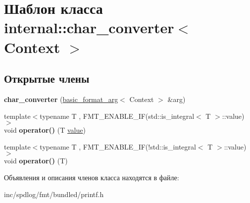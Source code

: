 \hypertarget{classinternal_1_1char__converter}{}\section{Шаблон класса internal\+:\+:char\+\_\+converter$<$ Context $>$}
\label{classinternal_1_1char__converter}
\subsection*{Открытые члены}
\begin{DoxyCompactItemize}
\item 
\mbox{\label{classinternal_1_1char__converter_acbd06428c2b41509849b0eb41588f4c5}} 
{\bfseries char\+\_\+converter} (\hyperlink{classbasic__format__arg}{basic\+\_\+format\+\_\+arg}$<$ Context $>$ \&arg)
\item 
\mbox{\label{classinternal_1_1char__converter_a07471e894f88a572a83e55327e84edc4}} 
{\footnotesize template$<$typename T , F\+M\+T\+\_\+\+E\+N\+A\+B\+L\+E\+\_\+\+I\+F(std\+::is\+\_\+integral$<$ T $>$\+::value) $>$ }\\void {\bfseries operator()} (T \hyperlink{classinternal_1_1value}{value})
\item 
\mbox{\label{classinternal_1_1char__converter_ac549e34d863b8b578b9493440d16cc9a}} 
{\footnotesize template$<$typename T , F\+M\+T\+\_\+\+E\+N\+A\+B\+L\+E\+\_\+\+I\+F(!std\+::is\+\_\+integral$<$ T $>$\+::value) $>$ }\\void {\bfseries operator()} (T)
\end{DoxyCompactItemize}


Объявления и описания членов класса находятся в файле\+:\begin{DoxyCompactItemize}
\item 
inc/spdlog/fmt/bundled/printf.\+h\end{DoxyCompactItemize}
